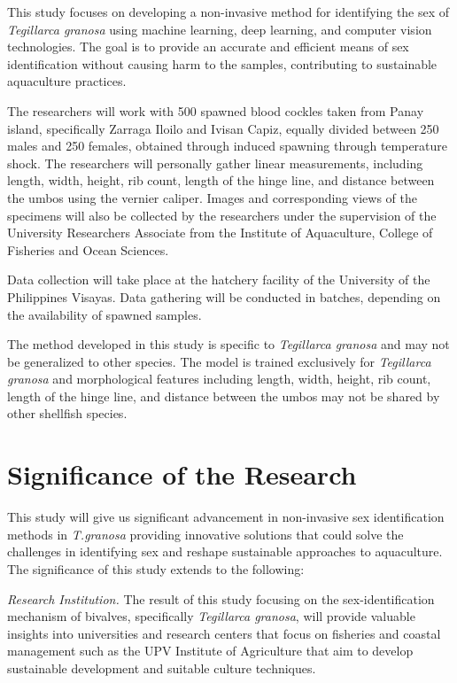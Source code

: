 This study focuses on developing a non-invasive method for identifying the sex of \textit{Tegillarca granosa} using machine learning, deep learning, and computer vision technologies. The goal is to provide an accurate and efficient means of sex identification without causing harm to the samples, contributing to sustainable aquaculture practices.

The researchers will work with 500 spawned blood cockles taken from Panay island, specifically Zarraga Iloilo and Ivisan Capiz, equally divided between 250 males and 250 females, obtained through induced spawning through temperature shock. The researchers will personally gather linear measurements, including length, width, height, rib count, length of the hinge line, and distance between the umbos using the vernier caliper. Images and corresponding views of the specimens will also be collected by the researchers under the supervision of the University Researchers Associate from the Institute of Aquaculture, College of Fisheries and Ocean Sciences.

Data collection will take place at the hatchery facility of the University of the Philippines Visayas. Data gathering will be conducted in batches, depending on the availability of spawned samples.

The method developed in this study is specific to \textit{Tegillarca granosa} and may not be generalized to other species. The model is trained exclusively for \textit{Tegillarca granosa} and  morphological features including length, width, height, rib count, length of the hinge line, and distance between the umbos may not be shared by other shellfish species. 

\section{Significance of the Research}
\label{sec:significance}

This study will give us significant advancement in non-invasive sex identification methods in \textit{T.granosa} providing innovative solutions that could solve the challenges in identifying sex  and reshape sustainable approaches to aquaculture. The significance of this study extends to the following:

 \textit{Research Institution.} The result of this study focusing on the sex-identification mechanism of bivalves, specifically \textit{Tegillarca granosa}, will provide valuable insights into universities and research centers that focus on fisheries and coastal management such as the UPV Institute of Agriculture that aim to develop sustainable development and suitable culture techniques.

